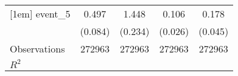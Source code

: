 {\begin{tabular}{l*{4}{c}}
[1em]
event\_5             &       0.497\sym{***}&       1.448\sym{***}&       0.106\sym{***}&       0.178\sym{***}\\
                    &     (0.084)         &     (0.234)         &     (0.026)         &     (0.045)         \\
\hline
Observations        &      272963         &      272963         &      272963         &      272963         \\
\(R^{2}\)           &                     &                     &                     &                     \\
\hline\hline
\end{tabular}
}
